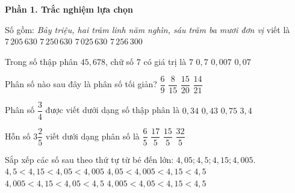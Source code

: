 \textbf{Phần 1. Trắc nghiệm lựa chọn}

\begin{ex} %
Số gồm: \textit{Bảy triệu, hai trăm linh năm nghìn, sáu trăm ba mươi đơn vị} viết là
\choice
{\True $7\,205\,630$}
{$7\,250\,630$}
{$7\,025\,630$}
{$7\,256\,300$}
\end{ex}

\begin{ex} %
Trong số thập phân $45{,}678$, chữ số $7$ có giá trị là
\choice
{$7$}
{$0{,}7$}
{$0{,}007$}
{\True $0{,}07$}
\end{ex}

\begin{ex} %
Phân số nào sau đây là phân số tối giản?
\choice
{$\dfrac{6}{9}$}
{\True $\dfrac{8}{15}$}
{$\dfrac{15}{20}$}
{$\dfrac{14}{21}$}
\end{ex}

\begin{ex} %
Phân số $\dfrac{3}{4}$ được viết dưới dạng số thập phân là
\choice
{$0{,}34$}
{$0{,}43$}
{\True $0{,}75$}
{$3{,}4$}
\end{ex}

\begin{ex} %
Hỗn số $3\dfrac{2}{5}$ viết dưới dạng phân số là
\choice
{$\dfrac{6}{5}$}
{\True $\dfrac{17}{5}$}
{$\dfrac{15}{5}$}
{$\dfrac{32}{5}$}
\end{ex}

\begin{ex} %
Sắp xếp các số sau theo thứ tự từ bé đến lớn: $4{,}05; 4{,}5; 4{,}15; 4{,}005$.
\choice
{$4{,}5 < 4{,}15 < 4{,}05 < 4{,}005$}
{$4{,}05 < 4{,}005 < 4{,}15 < 4{,}5$}
{$4{,}005 < 4{,}15 < 4{,}05 < 4{,}5$}
{\True $4{,}005 < 4{,}05 < 4{,}15 < 4{,}5$}
\end{ex}

